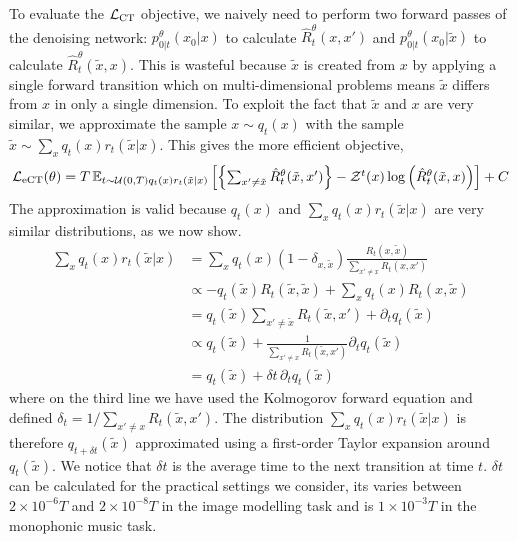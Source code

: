 \documentclass{article}
\begin{document}
To evaluate the $\mathcal{L}_{\textup{CT}}$ objective, we naively need to perform two forward passes of the denoising network: $p_{0|t}^\theta(x_0 | x)$ to calculate $\hat{R}_t^\theta(x, x')$ and $p_{0|t}^\theta(x_0 | \tilde{x})$ to calculate $\hat{R}_t^\theta(\tilde{x}, x)$. This is wasteful because $\tilde{x}$ is created from $x$ by applying a single forward transition which on multi-dimensional problems means $\tilde{x}$ differs from $x$ in only a single dimension. To exploit the fact that $\tilde{x}$ and $x$ are very similar, we approximate the sample $x \sim q_t(x)$ with the sample $\tilde{x} \sim \sum_{x} q_t(x) r_t(\tilde{x} | x)$. This gives the more efficient objective,
\begin{equation}
\textstyle
    \mathcal{L}_{\textup{eCT}}(\theta) = T \, \mathbb{E}_{t \sim \mathcal{U}(0, T) q_t(x) r_t(\tilde{x} | x)} \left[ \left\{ \sum_{x' \neq \tilde{x}} \hat{R}_t^\theta(\tilde{x}, x') \right\} - \mathcal{Z}^t(x) \log \left( \hat{R}_t^\theta(\tilde{x}, x) \right) \right] + C
\end{equation}
The approximation is valid because $q_t(x)$ and $\sum_x q_t(x) r_t(\tilde{x} | x)$ are very similar distributions, as we now show.
\begin{align}
    \sum_x q_t(x) r_t(\tilde{x} | x) &= \sum_x q_t(x) (1 - \delta_{x, \tilde{x}}) \frac{R_t(x, \tilde{x})}{\sum_{x' \neq x} R_t(x, x')}\\
    & \propto - q_t(\tilde{x}) R_t(\tilde{x}, \tilde{x}) + \sum_x q_t(x) R_t(x, \tilde{x}) \\
    & = q_t(\tilde{x}) \sum_{x' \neq \tilde{x}} R_t(\tilde{x}, x') + \partial_t q_t(\tilde{x}) \\
    & \propto q_t(\tilde{x}) + \frac{1}{\sum_{x' \neq x} R_t(\tilde{x}, x')} \partial_t q_t(\tilde{x})\\
    & = q_t(\tilde{x}) + \delta t \, \partial_t q_t(\tilde{x})
\end{align}
where on the third line we have used the Kolmogorov forward equation and defined $\delta_t = 1 / \sum_{x' \neq x} R_t(\tilde{x}, x')$. The distribution $\sum_x q_t(x) r_t(\tilde{x} | x)$ is therefore $q_{t+\delta t}(\tilde{x})$ approximated using a first-order Taylor expansion around $q_t(\tilde{x})$. We notice that $\delta t$ is the average time to the next transition at time $t$. $\delta t$ can be calculated for the practical settings we consider, its varies between $2 \times 10^{-6} T$ and $2 \times 10^{-8} T$ in the image modelling task and is $1 \times 10^{-3} T$ in the monophonic music task.\\
\end{document}
